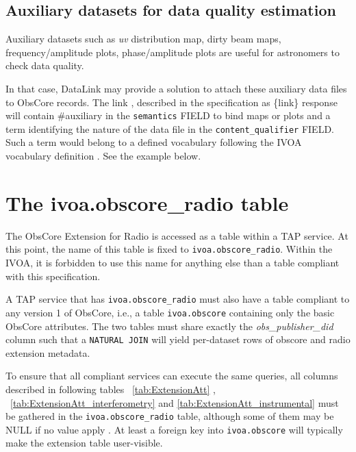 \documentclass[11pt,a4paper]{ivoa}
\begin{document}
\subsection{Auxiliary datasets  for data quality estimation}

Auxiliary datasets such as  \emph{uv} distribution map, dirty beam maps, frequency/amplitude plots, phase/amplitude plots are useful for astronomers to check data quality.

In that case,  DataLink \citep{2023ivoa.spec.1215B} may provide a solution to attach these auxiliary data files to ObsCore records. The link , described in  the specification as  \{link\}
response  will contain \#auxiliary in the \texttt{semantics} FIELD  to bind  maps or plots  and a term identifying the nature of the data file in  the \texttt{content\_qualifier} FIELD. Such a term would belong to a defined vocabulary  following the IVOA vocabulary definition  \citep{2021ivoa.spec.0525D} . See the example below. 

\section{The ivoa.obscore\_radio table}
\label{sec:implementation}
The ObsCore Extension for Radio is accessed as a table within a TAP
\citep{2019ivoa.spec.0927D} service.  At this
point, the name of this table is fixed to \verb|ivoa.obscore_radio|.
Within the IVOA, it is forbidden to use this name for anything else than a table compliant
with this specification.


A TAP service that has \verb|ivoa.obscore_radio| must also have a table
compliant to any version 1 of ObsCore, i.e., a table
\verb|ivoa.obscore| containing only the basic ObsCore attributes. The two tables must share exactly the \emph{obs\_publisher\_did} column such
that a \verb|NATURAL JOIN| will yield per-dataset rows of obscore and
radio extension metadata.  

To ensure that all compliant services can execute the same queries,
all columns described in following tables ~\ref{tab:ExtensionAtt} , ~\ref{tab:ExtensionAtt_interferometry} and \ref{tab:ExtensionAtt_instrumental} must be gathered  in the \verb|ivoa.obscore_radio|
table, although some of them may be NULL if no value apply . At least a foreign key into \verb|ivoa.obscore| will typically
make the extension table user-visible. 
\end{document}
